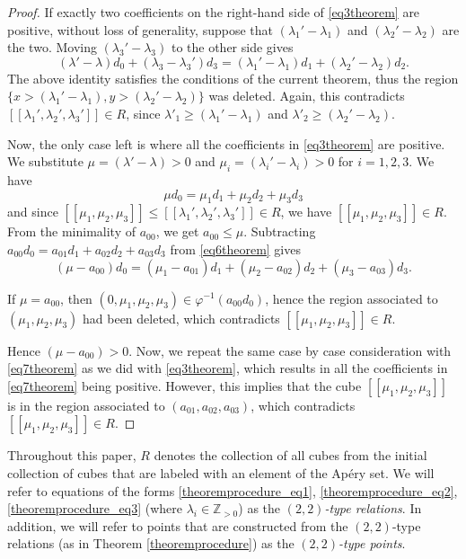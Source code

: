 \documentclass[12pt]{article}
\theoremstyle{remark}
\begin{document}
\begin{proof}
If exactly two coefficients on the right-hand side of \eqref{eq3theorem} are positive, without loss of generality, suppose that $(\lambda_1' - \lambda_1)$ and $(\lambda_2' - \lambda_2)$ are the two. Moving $(\lambda_3' - \lambda_3)$ to the other side gives
    \begin{equation}\label{eq5theorem}
        (\lambda' - \lambda)d_0  + (\lambda_3 - \lambda_3')d_3= (\lambda_1' - \lambda_1)d_1  + (\lambda_2' - \lambda_2)d_2.
    \end{equation}
The above identity satisfies the conditions of the current theorem, thus the region $\{x > (\lambda_1' - \lambda_1), y > (\lambda_2' - \lambda_2)\}$ was deleted. Again, this contradicts $[[\lambda_1',\lambda_2',\lambda_3']] \in R$, since $\lambda'_1 \geq (\lambda_1' - \lambda_1)$ and $\lambda'_2 \geq (\lambda_2' - \lambda_2)$.

Now, the only case left is where all the coefficients in \eqref{eq3theorem} are positive. We substitute $\mu =(\lambda' - \lambda)  > 0$ and $\mu_i =(\lambda_i' - \lambda_i)  >0$ for $i = 1,2,3$. We have
    \begin{equation}\label{eq6theorem}
         \mu d_0 = \mu_1d_1 + \mu_2d_2 + \mu_3d_3
    \end{equation}
and since $[[\mu_1,\mu_2,\mu_3]] \leq [[\lambda_1',\lambda_2',\lambda_3']] \in R$, we have $[[\mu_1,\mu_2,\mu_3]] \in R$. 
From the minimality of $a_{00}$, we get $a_{00} \leq \mu$. Subtracting $a_{00}d_0 = a_{01}d_1 + a_{02}d_2 + a_{03}d_3$ from \eqref{eq6theorem} gives
\begin{equation}\label{eq7theorem}
    (\mu - a_{00}) d_0 = (\mu_1 - a_{01})d_1 +  (\mu_2 - a_{02})d_2 + (\mu_3 - a_{03})d_3.
\end{equation}
    
If $\mu = a_{00}$, then $(0,\mu_1,\mu_2,\mu_3) \in \varphi^{-1}(a_{00}d_0)$, hence the region associated to $(\mu_1,\mu_2,\mu_3)$ had been deleted, which contradicts $[[\mu_1,\mu_2,\mu_3]] \in R$. 

Hence $(\mu - a_{00}) > 0$. Now, we repeat the same case by case consideration with \eqref{eq7theorem} as we did with \eqref{eq3theorem}, which results in all the coefficients in \eqref{eq7theorem} being positive. However, this implies that the cube $[[\mu_1,\mu_2,\mu_3]]$ is in the region associated to $(a_{01}, a_{02}, a_{03})$, which contradicts $[[\mu_1,\mu_2,\mu_3]] \in R$. 
\end{proof}

Throughout this paper, $R$ denotes the collection of all cubes from the initial collection of cubes that are labeled with an element of the Ap{\'e}ry set.
We will refer to equations of the forms \eqref{theoremprocedure_eq1}, \eqref{theoremprocedure_eq2}, \eqref{theoremprocedure_eq3} (where $\lambda_i \in \mathbb{Z}_{>0}$) as the \emph{$(2,2)$-type relations}. In addition, we will refer to points that are constructed from the $(2,2)$-type relations (as in Theorem \ref{theoremprocedure}) as the \emph{$(2,2)$-type points}. 
\end{document}
